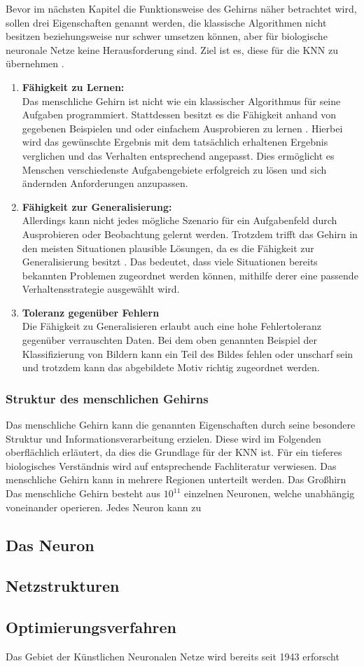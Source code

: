 Bevor im nächsten Kapitel die Funktionsweise des Gehirns näher betrachtet wird, sollen drei Eigenschaften genannt werden, die klassische Algorithmen nicht besitzen beziehungsweise nur schwer umsetzen können, aber für biologische neuronale Netze keine Herausforderung sind. Ziel ist es, diese für die \ac{KNN} zu übernehmen \cite{kriesel2008kleiner}.
\begin{enumerate}
	\item \textbf{ Fähigkeit zu Lernen:} \\
	Das menschliche Gehirn ist nicht wie ein klassischer Algorithmus für seine Aufgaben programmiert. Stattdessen besitzt es die Fähigkeit anhand von gegebenen Beispielen und oder einfachem Ausprobieren zu lernen \cite{kriesel2008kleiner}. Hierbei wird das gewünschte Ergebnis mit dem tatsächlich erhaltenen Ergebnis verglichen und das Verhalten entsprechend angepasst. Dies ermöglicht es Menschen verschiedenste Aufgabengebiete erfolgreich zu lösen und sich ändernden Anforderungen anzupassen.
	
	\item \textbf{Fähigkeit zur Generalisierung:}\\
	Allerdings kann nicht jedes mögliche Szenario für ein Aufgabenfeld durch Ausprobieren oder Beobachtung gelernt werden. Trotzdem trifft das Gehirn in den meisten Situationen plausible Lösungen, da es die Fähigkeit zur Generalisierung besitzt 
	\cite{kriesel2008kleiner}. Das bedeutet, dass viele Situationen bereits bekannten Problemen zugeordnet werden können, mithilfe derer eine passende Verhaltensstrategie ausgewählt wird. 
	
	\item \textbf{Toleranz gegenüber Fehlern}\\
	Die Fähigkeit zu Generalisieren erlaubt auch eine hohe Fehlertoleranz gegenüber verrauschten Daten. Bei dem oben genannten Beispiel der Klassifizierung von Bildern kann ein Teil des Bildes fehlen oder unscharf sein und trotzdem kann das abgebildete Motiv richtig zugeordnet werden.
\end{enumerate}

\subsubsection{Struktur des menschlichen Gehirns}
Das menschliche Gehirn kann die genannten Eigenschaften durch seine besondere Struktur und Informationsverarbeitung erzielen. Diese wird im Folgenden oberflächlich erläutert, da dies die Grundlage für der \ac{KNN} ist. Für ein tieferes biologisches Verständnis wird auf entsprechende Fachliteratur verwiesen.
Das menschliche Gehirn kann in mehrere Regionen unterteilt werden. Das Großhirn
Das menschliche Gehirn besteht aus ${10}^{11}$ einzelnen Neuronen, welche unabhängig voneinander operieren. Jedes Neuron kann zu 

\subsection{Das Neuron}
\subsection{Netzstrukturen}
\subsection{Optimierungsverfahren}

Das Gebiet der Künstlichen Neuronalen Netze wird bereits seit 1943 erforscht